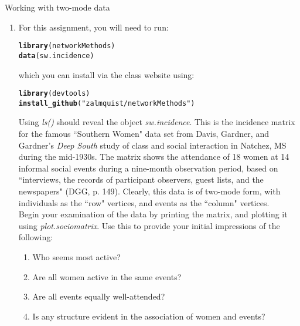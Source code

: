 \documentclass[11pt, oneside]{article}\usepackage[]{graphicx}\usepackage[]{color}
\makeatletter
\newcommand{\hlstr}[1]{\textcolor[rgb]{0.192,0.494,0.8}{#1}}%
\newcommand{\hlstd}[1]{\textcolor[rgb]{0.345,0.345,0.345}{#1}}%
\newcommand{\hlkwd}[1]{\textcolor[rgb]{0.737,0.353,0.396}{\textbf{#1}}}%
\newenvironment{kframe}{%
 \def\at@end@of@kframe{}%
 \ifinner\ifhmode%
  \def\at@end@of@kframe{\end{minipage}}%
  \begin{minipage}{\columnwidth}%
 \fi\fi%
 \def\FrameCommand##1{\hskip\@totalleftmargin \hskip-\fboxsep
 \colorbox{shadecolor}{##1}\hskip-\fboxsep
     \hskip-\linewidth \hskip-\@totalleftmargin \hskip\columnwidth}%
 \MakeFramed {\advance\hsize-\width
   \@totalleftmargin\z@ \linewidth\hsize
   \@setminipage}}%
 {\par\unskip\endMakeFramed%
 \at@end@of@kframe}
\newenvironment{knitrout}{}{} %
\newenvironment{prob}[2][Problem]{\begin{trivlist}
\item[\hskip \labelsep {\bfseries #1}\hskip \labelsep {\bfseries #2.}]}{\end{trivlist}}
\makeatother
\begin{document}
\begin{prob}{2}
\label{lec12:prob2}
Working with two-mode data

 \renewcommand{\labelenumi}{(\alph{enumi})}
 \renewcommand{\labelenumii}{\roman{enumii}.}

\begin{enumerate}
\item For this assignment, you will need to run:
\begin{knitrout}
\color{fgcolor}\begin{kframe}
\begin{alltt}
\hlkwd{library}\hlstd{(networkMethods)}
\hlkwd{data}\hlstd{(sw.incidence)}
\end{alltt}
\end{kframe}
\end{knitrout}

which you can install via the class website using:
\begin{knitrout}
\color{fgcolor}\begin{kframe}
\begin{alltt}
\hlkwd{library}\hlstd{(devtools)}
\hlkwd{install_github}\hlstd{(}\hlstr{"zalmquist/networkMethods"}\hlstd{)}
\end{alltt}
\end{kframe}
\end{knitrout}

Using \emph{ls()} should reveal the object \emph{sw.incidence}. This is the incidence matrix for the famous ``Southern Women" data set from Davis, Gardner, and Gardner's \emph{Deep South} study of class and social interaction in Natchez, MS during the mid-1930s. The matrix shows the attendance of 18 women at 14 informal social events during a nine-month observation period, based on ``interviews, the records of participant observers, guest lists, and the newspapers" (DGG, p. 149). Clearly, this data is of two-mode form, with individuals as the ``row" vertices, and events as the ``column" vertices. \\

\noindent
Begin your examination of the data by printing the matrix, and plotting it using \emph{plot.sociomatrix}. Use this to provide your initial impressions of the following:
\begin{enumerate}
\item Who seems most active?
\item Are all women active in the same events?
\item Are all events equally well-attended?
\item Is any structure evident in the association of women and events?
\end{enumerate}


\end{enumerate}
\end{prob}
\end{document}
